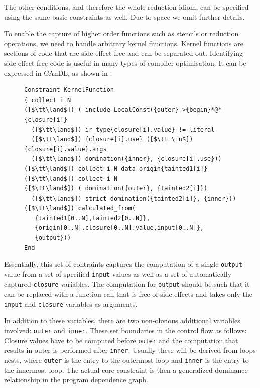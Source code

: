 The other conditions, and therefore the whole reduction idiom, can be specified using the same basic constraints as well.
Due to space we omit further details.



\newpage

    To enable the capture of higher order functions such as stencils or
    reduction operations, we need to handle arbitrary kernel functions.
    Kernel functions are sections of code that are side-effect free and
    can be separated out. Identifying side-effect free code is useful in
    many types of compiler optimisation.  It can be expressed in CAnDL, as
    shown in .

\begin{figure}[ht]
\begin{lstlisting}[language=CAnDL,label={fig:kernel},caption=
   {CAnDL Formulation of Kernel Functions}]
Constraint KernelFunction
( collect i N
([$\tt\land$]) ( include LocalConst({outer}->{begin}*@*{closure[i]}
  ([$\tt\land$]) ir_type{closure[i].value} != literal
  ([$\tt\land$]) {closure[i].use} ([$\tt \in$]) {closure[i].value}.args
  ([$\tt\land$]) domination({inner}, {closure[i].use}))
([$\tt\land$]) collect i N data_origin{tainted1[i]}
([$\tt\land$]) collect i N
([$\tt\land$]) ( domination({outer}, {tainted2[i]})
  ([$\tt\land$]) strict_domination({tainted2[i]}, {inner}))
([$\tt\land$]) calculated_from(
   {tainted1[0..N],tainted2[0..N]},
   {origin[0..N],closure[0..N].value,input[0..N]},
   {output}))
End
\end{lstlisting}
\end{figure}

    Essentially, this set of contraints captures the computation of a
    single \texttt{output} value from a set of specified \texttt{input}
    values as well as a set of automatically captured \texttt{closure}
    variables.  The computation for \texttt{output} should be such that it
    can be replaced with a function call that is free of side effects and
    takes only the \texttt{input} and \texttt{closure} variables as
    arguments.

    In addition to these variables, there are two non-obvious additional
    variables involved: \texttt{outer} and \texttt{inner}.
    These set boundaries in the control flow as follows: Closure values have to
    be computed before \texttt{outer} and the computation that results in outer
    is performed after \texttt{inner}.
    Usually these will be derived from loops nests, where \texttt{outer} is the
    entry to the outermost loop and \texttt{inner} is the entry to the innermost
    loop.
    The actual core constraint is then a generalized dominance relationship in
    the program dependence graph.

